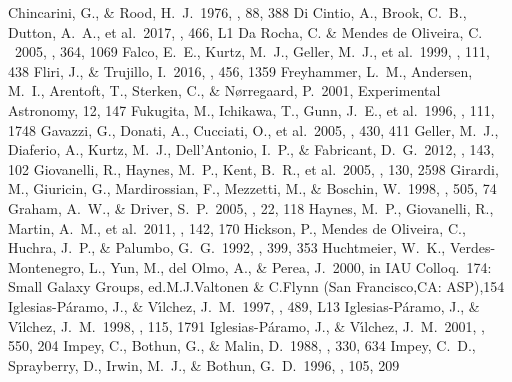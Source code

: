 \documentclass[twocolumn,trackchanges]{aastex61}
\begin{document}
\begin{thebibliography}{a}
 Chincarini, G., \& Rood, H.~J.\ 1976, \pasp, 88, 388 
 Di Cintio, A., Brook, C.~B., Dutton, A.~A., et al.\ 2017, \mnras, 466, L1 
 Da Rocha, C. \& Mendes de Oliveira, C. \ 2005, \mnras, 364, 1069
 Falco, E.~E., Kurtz, M.~J., Geller, M.~J., et al.\ 1999, \pasp, 111, 438 
 Fliri, J., \& Trujillo, I.\ 2016, \mnras, 456, 1359 
 Freyhammer, L.~M., Andersen, M.~I., Arentoft, T., Sterken, C., \& N{\o}rregaard, P.\ 2001, Experimental Astronomy, 12, 147 
 Fukugita, M., Ichikawa, T., Gunn, J.~E., et al.\ 1996, \aj, 111, 1748 
 Gavazzi, G., Donati, A., Cucciati, O., et al.\ 2005, \aap, 430, 411 
 Geller, M.~J., Diaferio, A., Kurtz, M.~J., Dell'Antonio, I.~P., \& Fabricant, D.~G.\ 2012, \aj, 143, 102
 Giovanelli, R., Haynes, M.~P., Kent, B.~R., et al.\ 2005, \aj, 130, 2598 
 Girardi, M., Giuricin, G., Mardirossian, F., Mezzetti, M., \& Boschin, W.\ 1998, \apj, 505, 74 
 Graham, A.~W., \& Driver, S.~P.\ 2005, \pasa, 22, 118 
 Haynes, M.~P., Giovanelli, R., Martin, A.~M., et al.\ 2011, \aj, 142, 170 
 Hickson, P., Mendes de Oliveira, C., Huchra, J.~P., \& Palumbo, G.~G.\ 1992, \apj, 399, 353
 Huchtmeier, W.~K., Verdes-Montenegro, L., Yun, M., del Olmo, A., \& Perea, J.\ 2000, in IAU Colloq.~174: Small Galaxy Groups, ed.M.J.Valtonen \& C.Flynn (San Francisco,CA: ASP),154
 Iglesias-P{\'a}ramo, J., \& V{\'{\i}}lchez, J.~M.\ 1997, \apjl, 489, L13 
 Iglesias-P{\'a}ramo, J., \& V{\'{\i}}lchez, J.~M.\ 1998, \aj, 115, 1791 
 Iglesias-P{\'a}ramo, J., \& V{\'{\i}}lchez, J.~M.\ 2001, \apj, 550, 204 
 Impey, C., Bothun, G., \& Malin, D.\ 1988, \apj, 330, 634 
 Impey, C.~D., Sprayberry, D., Irwin, M.~J., \& Bothun, G.~D.\ 1996, \apjs, 105, 209 

\end{thebibliography}
\end{document}
